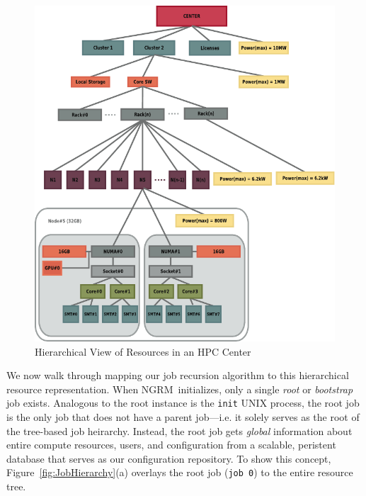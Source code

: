 \documentclass[10pt]{article}
\newcommand{\ngrm}{NGRM}
\begin{document}
\begin{figure}
\centering
\includegraphics[scale=0.75]{../fig/resource-hierarchy}
\caption{Hierarchical View of Resources in an HPC Center}
\label{fig:ResHierarchy}
\end{figure}

We now walk through mapping our job recursion algorithm to this hierarchical
resource representation.
When \ngrm\ initializes, only a single {\em root} or {\em
bootstrap} job exists. Analogous to the root instance is the 
{\tt init} UNIX process, the root job is the only job
that does not have a parent job---i.e. it solely serves as the root of
the tree-based job heirarchy. 
Instead,  the root job gets {\em global} information about entire compute resources,
users, and configuration from a scalable, peristent database that 
serves as our configuration repository.
To show this concept, Figure~\ref{fig:JobHierarchy}(a) overlays the root job ({\tt job 0})
to the entire resource tree. 



\end{document}
